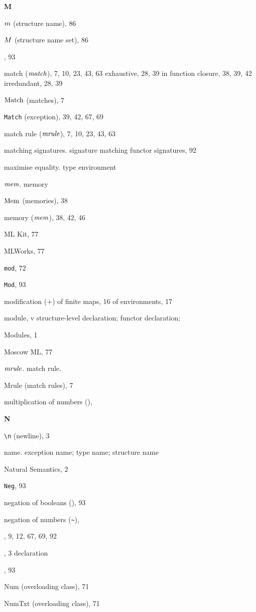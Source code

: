 \begin{theindex}
\parbox{65mm}{\hfil{\large\bf M}\hfil}

\indexspace

\item $m$ (structure name), 86
\item $M$ (structure name set), 86
\item {}, 93
\item match (${\it match}$), 7, 10, 23, 43, 63
\subitem exhaustive, 28, 39
\subitem in function closure, 38, 39, 42
\subitem irredundant, 28, 39
\item ${\rm Match}$ (matches), 7
\item {\tt Match} (exception), 39, 42, 67, 69
\item match rule (${\it mrule}$), 7, 10, 23, 43, 63
\item matching 
\subitem signatures. \see signature matching 
\subitem functor signatures, 92
\item maximise equality. \see type environment
\item $\mbox{\it mem}$. \see memory
\item ${\rm Mem}$ (memories), 38
\item memory ($\mbox{\it mem}$), 38, 42, 46
\item ML Kit, 77
\item MLWorks, 77
\item {\tt mod}, 72
\item {\tt Mod}, 93
\item modification ($+$) 
\subitem of finite maps, 16
\subitem of environments, 17
\item module, v
\subitem \seealso structure-level declaration; functor declaration; 
\item Modules, 1
\item Moscow ML, 77
\item ${\it mrule}$.  \see match rule.
\item Mrule (match rules), 7
\item multiplication of numbers (\ml{*}), \mulrefs
\indexspace

\parbox{65mm}{\hfil{\large\bf N}\hfil}

\indexspace
\item \verb+\n+ (newline), 3
\item name. \see exception name; type name; structure name
\item Natural Semantics, 2
\item {\tt Neg}, 93
\item negation of booleans (), 93
\item negation of numbers (\verb+~+), \unaryminusrefs
\item \NIL, 9, 12, 67, 69, 92
\item \NONFIX, 3
\subitem \seealso declaration
\item {}, 93
\item Num (overloading class), 71
\item NumTxt (overloading class), 71
\indexspace


\end{theindex}
